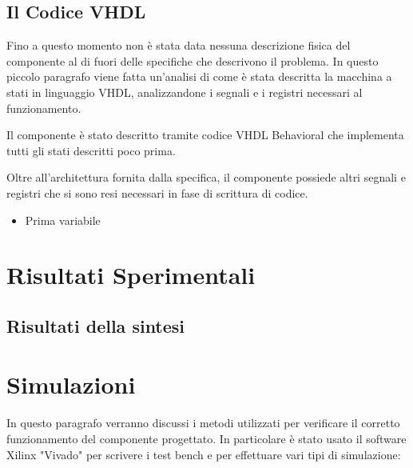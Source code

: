 \documentclass{article}
\begin{document}
\subsection{Il Codice VHDL}

Fino a questo momento non è stata data nessuna descrizione fisica del componente al di fuori delle specifiche che descrivono il problema. In questo piccolo paragrafo viene fatta un'analisi di come è stata descritta la macchina a stati in linguaggio VHDL, analizzandone i segnali e i registri necessari al funzionamento.

Il componente è stato descritto tramite codice VHDL Behavioral che implementa tutti gli stati descritti poco prima. %

 Oltre all'architettura fornita dalla specifica, il componente possiede altri segnali e registri che si sono resi necessari in fase di scrittura di codice.



\begin{itemize}

\item Prima variabile
\end{itemize}



\section{Risultati Sperimentali}

\subsection{Risultati della sintesi}





\section{Simulazioni}

In questo paragrafo verranno discussi i metodi utilizzati per verificare il corretto funzionamento del componente progettato. In particolare è stato usato il software Xilinx "Vivado" per scrivere i test bench e per effettuare vari tipi di simulazione: 
\end{document}
